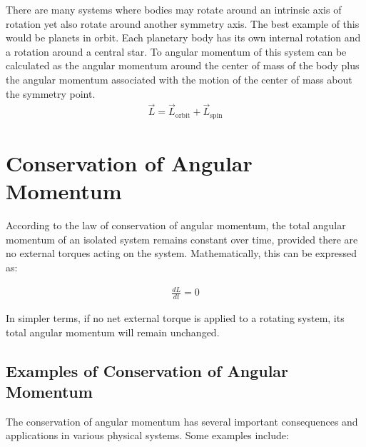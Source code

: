 \documentclass[11pt]{article}
\begin{document}
There are many systems where bodies may rotate around an intrinsic axis of rotation yet also rotate around another symmetry axis. The best example of this would be planets in orbit. Each planetary body has its own internal rotation and a rotation around a central star. To angular momentum of this system can be calculated as the angular momentum around the center of mass of the body plus the angular momentum associated with the motion of the center of mass about the symmetry point.
\begin{align*}
    \Vec{L} = \Vec{L}_{\text{orbit}} + \Vec{L}_{\text{spin}}
\end{align*}

\section{Conservation of Angular Momentum}

According to the law of conservation of angular momentum, the total angular momentum of an isolated system remains constant over time, provided there are no external torques acting on the system. Mathematically, this can be expressed as:

\begin{align*}
    \frac{{dL}}{{dt}} = 0
\end{align*}

In simpler terms, if no net external torque is applied to a rotating system, its total angular momentum will remain unchanged.

\subsection{Examples of Conservation of Angular Momentum}

The conservation of angular momentum has several important consequences and applications in various physical systems. Some examples include:
\end{document}
